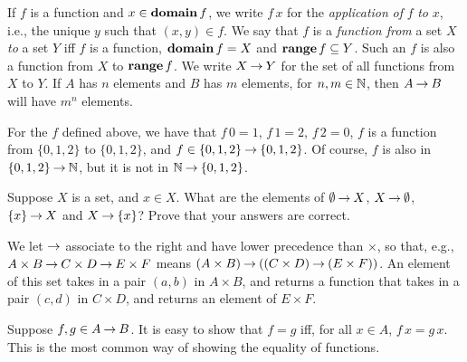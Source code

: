 If $f$ is a function and $x\in\mathbf{domain}\,f$, we write $f\,x$ for the
\emph{application}
%
%
%
%
\emph{of} $f$ \emph{to} $x$, i.e., the unique $y$ such that $(x,y)\in f$.
We say that $f$ is a \emph{function from}
%
a set $X$ \emph{to} a set $Y$ iff $f$ is a function, $\mathbf{domain}\,f=X$
and $\mathbf{range}\,f\subseteq Y$. Such an $f$ is also a function from
$X$ to $\mathbf{range}\,f$. We write $X\mathbin{\to} Y$
%
%
for the set of all functions from $X$ to $Y$.
If $A$ has $n$ elements and $B$ has $m$ elements, for $n,m\in\mathbb{N}$,
then $A\mathbin{\to} B$ will have $m^n$ elements.

For the $f$ defined above, we have that $f\,0=1$, $f\,1=2$,
$f\,2=0$, $f$ is a function from $\{0,1,2\}$ to $\{0,1,2\}$,
and $f\in\{0,1,2\}\mathbin{\to}\{0,1,2\}$.  Of course, $f$ is
also in $\{0,1,2\}\mathbin{\to}\mathbb{N}$, but it is not in
$\mathbb{N}\mathbin{\to}\{0,1,2\}$.

\begin{exercise}
Suppose $X$ is a set, and $x\in X$.  What are the elements of
$\emptyset\mathbin{\to} X$, $X\mathbin{\to}\emptyset$, $\{x\}\mathbin{\to} X$ and $X\mathbin{\to}\{x\}$?
Prove that your answers are correct.
\end{exercise}

We let $\mathbin{\to}$ associate to the right and have lower precedence than
$\times$, so that, e.g., $A\times B\mathbin{\to} C\times D\mathbin{\to} E\times F$ means
$(A\times B)\mathbin{\to}((C\times D)\mathbin{\to}(E\times F))$.  An element of this set
takes in a pair $(a,b)$ in $A\times B$, and returns a function
that takes in a pair $(c,d)$ in $C\times D$, and returns an
element of $E\times F$.

Suppose $f,g\in A\mathbin{\to} B$.  It is easy to show that $f=g$ iff, for all
$x\in A$, $f\,x=g\,x$.  This is the most common way of showing
the equality of functions.
%

